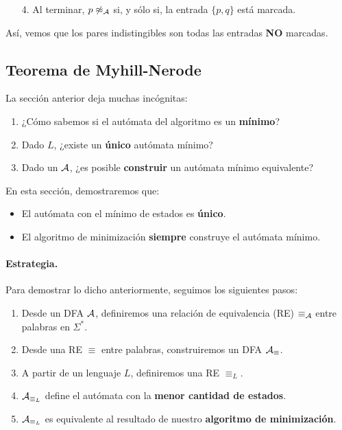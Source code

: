\begin{enumerate}
    \item[4.] Al terminar, $p \not\approx_{\mathcal{A}}$ si, y sólo si, la entrada $\{p,q\}$ está marcada.
\end{enumerate}

Así, vemos que los pares indistingibles son todas las entradas \textbf{NO} marcadas.

\subsection{Teorema de Myhill-Nerode}

La sección anterior deja muchas incógnitas:
\begin{enumerate}
    \item ¿Cómo sabemos si el autómata del algoritmo es un \textbf{mínimo}?
    \item Dado $L$, ¿existe un \textbf{único} autómata mínimo?
    \item Dado un $\mathcal{A}$, ¿es posible \textbf{construir} un autómata mínimo equivalente?
\end{enumerate}

En esta sección, demostraremos que:
\begin{itemize}
    \item El autómata con el mínimo de estados es \textbf{único}.
    \item El algoritmo de minimización \textbf{siempre} construye el autómata mínimo.
\end{itemize}

\paragraph{Estrategia.} Para demostrar lo dicho anteriormente, seguimos los siguientes pasos:
\begin{enumerate}
    \item Desde un DFA $\mathcal{A}$, definiremos una relación de equivalencia (RE) $\equiv_{\mathcal{A}}$ entre palabras en $\Sigma^*$.
    \item Desde una RE $\equiv$ entre palabras, construiremos un DFA $\mathcal{A}_\equiv$.
    \item A partir de un lenguaje $L$, definiremos una RE $\equiv_L$.
    \item $\mathcal{A}_{\equiv_L}$ define el autómata con la \textbf{menor cantidad de estados}.
    \item $\mathcal{A}_{\equiv_L}$ es equivalente al resultado de nuestro \textbf{algoritmo de minimización}.
\end{enumerate}

